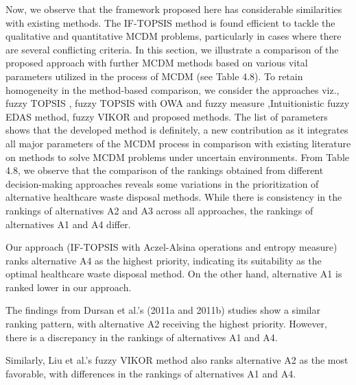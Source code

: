 \begin{flushleft}
 \pagebreak
 Now, we observe that the framework proposed here has
considerable similarities with existing methods. The IF-TOPSIS
method is found efficient to tackle the qualitative and quantitative
MCDM problems, particularly in cases where there are several
conflicting criteria.
In this section, we illustrate a comparison of the proposed
approach with further MCDM methods based on various
vital parameters utilized in the process of MCDM (see Table 4.8).
To retain homogeneity in the method-based comparison, we consider the approaches
viz., fuzzy TOPSIS \cite{4}, fuzzy TOPSIS
with OWA and fuzzy measure \cite{3},Intuitionistic fuzzy EDAS method\cite{7}, fuzzy VIKOR
\cite{6} and proposed methods.
\vspace{0.3cm}
\newline
The list of parameters shows that the developed method is
definitely, a new contribution as it integrates all major parameters
of the MCDM process in comparison with existing literature on
methods to solve MCDM problems under uncertain environments.
\vspace{0.3cm}
\newline
From Table 4.8, we observe that the comparison of the rankings obtained from different decision-making approaches reveals some variations in the prioritization of alternative healthcare waste disposal methods. While there is consistency in the rankings of alternatives A2 and A3 across all approaches, the rankings of alternatives A1 and A4 differ.

\vspace{3mm}

Our approach (IF-TOPSIS with Aczel-Alsina operations and entropy measure) ranks alternative A4 as the highest priority, indicating its suitability as the optimal healthcare waste disposal method. On the other hand, alternative A1 is ranked lower in our approach.

\vspace{3mm}

The findings from Dursan et al.'s (2011a and 2011b) studies show a similar ranking pattern, with alternative A2 receiving the highest priority. However, there is a discrepancy in the rankings of alternatives A1 and A4.

\vspace{3mm}

Similarly, Liu et al.'s fuzzy VIKOR method also ranks alternative A2 as the most favorable, with differences in the rankings of alternatives A1 and A4.

\vspace{3mm}


\end{flushleft}
